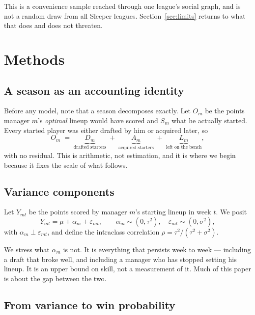 \documentclass[11pt]{article}
\begin{document}
This is a convenience sample reached through one league's social graph, and is
not a random draw from all Sleeper leagues. Section~\ref{sec:limits} returns to
what that does and does not threaten.

\section{Methods}\label{sec:methods}

\subsection{A season as an accounting identity}

Before any model, note that a season decomposes exactly. Let $O_m$ be the points
manager $m$'s \emph{optimal} lineup would have scored and $S_m$ what he actually
started. Every started player was either drafted by him or acquired later, so
\begin{equation}
O_m \;=\; \underbrace{D_m}_{\text{drafted starters}}
\;+\; \underbrace{A_m}_{\text{acquired starters}}
\;+\; \underbrace{L_m}_{\text{left on the bench}} ,
\label{eq:identity}
\end{equation}
with no residual. This is arithmetic, not estimation, and it is where we begin
because it fixes the scale of what follows.

\subsection{Variance components}

Let $Y_{mt}$ be the points scored by manager $m$'s starting lineup in week $t$.
We posit
\begin{equation}
Y_{mt} = \mu + \alpha_m + \varepsilon_{mt}, \qquad
\alpha_m \sim (0, \tau^2), \quad \varepsilon_{mt} \sim (0, \sigma^2),
\label{eq:model}
\end{equation}
with $\alpha_m \perp \varepsilon_{mt}$, and define the intraclass correlation
$\rho = \tau^2/(\tau^2+\sigma^2)$.

We stress what $\alpha_m$ is not. It is everything that persists week to week
--- including a draft that broke well, and including a manager who has stopped
setting his lineup. It is an upper bound on skill, not a measurement of it. Much
of this paper is about the gap between the two.

\subsection{From variance to win probability}
\end{document}
